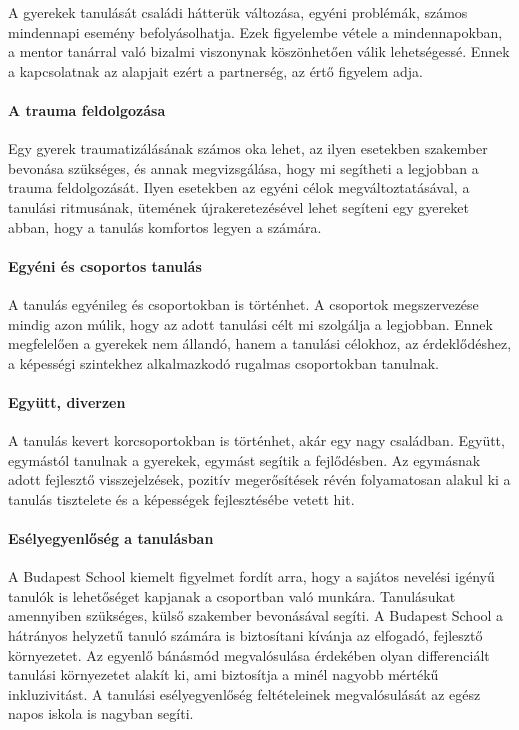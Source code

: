 A gyerekek tanulását családi hátterük változása, egyéni problémák,
számos mindennapi esemény befolyásolhatja. Ezek figyelembe vétele a
mindennapokban, a mentor tanárral való bizalmi viszonynak köszönhetően
válik lehetségessé. Ennek a kapcsolatnak az alapjait ezért a partnerség,
az értő figyelem adja.

\paragraph{A trauma feldolgozása}

Egy gyerek traumatizálásának számos oka lehet, az ilyen esetekben
szakember bevonása szükséges, és annak megvizsgálása, hogy mi segítheti
a legjobban a trauma feldolgozását. Ilyen esetekben az egyéni célok
megváltoztatásával, a tanulási ritmusának, ütemének újrakeretezésével
lehet segíteni egy gyereket abban, hogy a tanulás komfortos legyen a
számára.

\paragraph{Egyéni és csoportos
      tanulás}

A tanulás egyénileg és csoportokban is történhet. A csoportok
megszervezése mindig azon múlik, hogy az adott tanulási célt mi
szolgálja a legjobban. Ennek megfelelően a gyerekek nem állandó, hanem a
tanulási célokhoz, az érdeklődéshez, a képességi szintekhez alkalmazkodó
rugalmas csoportokban tanulnak.

\paragraph{Együtt, diverzen}

A tanulás kevert korcsoportokban is történhet, akár egy nagy családban. Együtt,
egymástól tanulnak a gyerekek, egymást segítik a fejlődésben. Az egymásnak
adott fejlesztő visszejelzések, pozitív megerősítések révén folyamatosan alakul
ki a tanulás tisztelete és a képességek fejlesztésébe vetett hit.

\paragraph{Esélyegyenlőség a
      tanulásban}

A Budapest School kiemelt figyelmet fordít arra, hogy a sajátos nevelési
igényű tanulók is lehetőséget kapjanak a csoportban való munkára.
Tanulásukat amennyiben szükséges, külső szakember bevonásával segíti. A
Budapest School a hátrányos helyzetű tanuló számára is biztosítani
kívánja az elfogadó, fejlesztő környezetet. Az egyenlő bánásmód
megvalósulása érdekében olyan differenciált tanulási környezetet alakít
ki, ami biztosítja a minél nagyobb mértékű inkluzivitást. A tanulási
esélyegyenlőség feltételeinek megvalósulását az egész napos iskola is
nagyban segíti.


